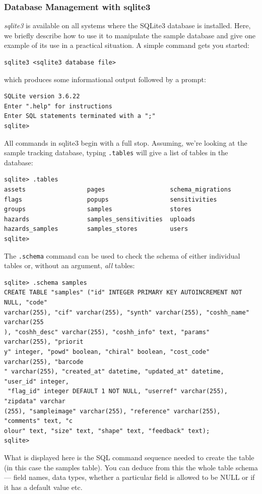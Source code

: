 \documentclass[12pt,twoside]{article}
\begin{document}
\subsubsection{Database Management with sqlite3}
\emph{sqlite3} is available on all systems where the SQLite3 database
is installed. Here, we briefly describe how to use it to manipulate the
sample database and give one example of its use in a practical situation.
A simple command gets you started:
\begin{verbatim}
sqlite3 <sqlite3 database file>
\end{verbatim}
which produces some informational output followed by a prompt:
\begin{verbatim}
SQLite version 3.6.22
Enter ".help" for instructions
Enter SQL statements terminated with a ";"
sqlite> 
\end{verbatim}
All commands in sqlite3 begin with a full stop. Assuming, we're looking
at the sample tracking database, typing \verb=.tables= will give a list
of tables in the database:
\begin{verbatim}
sqlite> .tables
assets                 pages                  schema_migrations    
flags                  popups                 sensitivities        
groups                 samples                stores               
hazards                samples_sensitivities  uploads              
hazards_samples        samples_stores         users                
sqlite> 
\end{verbatim}
The \verb=.schema= command can be used to check the schema of either
individual tables or, without an argument, \emph{all} tables:

\small
\begin{verbatim}
sqlite> .schema samples
CREATE TABLE "samples" ("id" INTEGER PRIMARY KEY AUTOINCREMENT NOT NULL, "code"
varchar(255), "cif" varchar(255), "synth" varchar(255), "coshh_name" varchar(255
), "coshh_desc" varchar(255), "coshh_info" text, "params" varchar(255), "priorit
y" integer, "powd" boolean, "chiral" boolean, "cost_code" varchar(255), "barcode
" varchar(255), "created_at" datetime, "updated_at" datetime, "user_id" integer,
 "flag_id" integer DEFAULT 1 NOT NULL, "userref" varchar(255), "zipdata" varchar
(255), "sampleimage" varchar(255), "reference" varchar(255), "comments" text, "c
olour" text, "size" text, "shape" text, "feedback" text);
sqlite> 
\end{verbatim}
\normalsize

What is displayed here is the SQL command sequence needed to create the
table (in this case the samples table). You can deduce from this the whole
table schema --- field names, data types, whether a particular field is
allowed to be NULL or if it has a default value etc.
\end{document}
